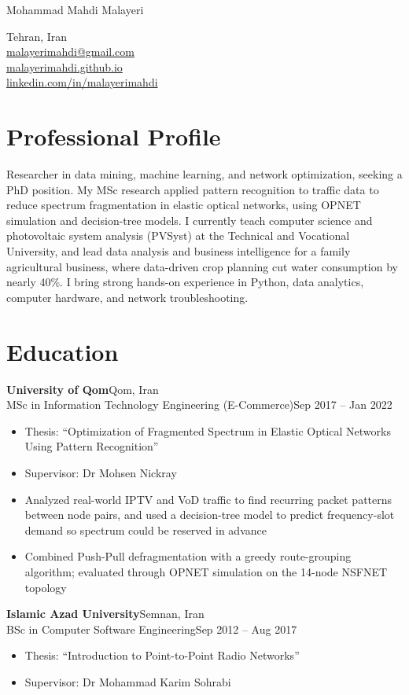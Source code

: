 \documentclass[10pt]{article}
\newcommand{\entry}[4]{\needspace{4\baselineskip}\textbf{#1}\hfill #2\\#3\hfill #4\par}
\newenvironment{dashes}{\begin{itemize}[label=--,leftmargin=2.2em,topsep=1pt,itemsep=0pt,parsep=0pt]}{\end{itemize}}
\newcommand{\gap}{\vspace{3pt}}
\begin{document}
{\fontsize{24}{28}\selectfont Mohammad Mahdi Malayeri}\hfill
\begin{minipage}[b]{0.42\textwidth}\raggedleft\small
Tehran, Iran\\
\href{mailto:malayerimahdi@gmail.com}{malayerimahdi@gmail.com}\\
\href{https://malayerimahdi.github.io}{malayerimahdi.github.io}\\
\href{https://www.linkedin.com/in/malayerimahdi/}{linkedin.com/in/malayerimahdi}
\end{minipage}

\section{Professional Profile}
Researcher in data mining, machine learning, and network optimization, seeking a PhD position. My MSc research applied pattern recognition to traffic data to reduce spectrum fragmentation in elastic optical networks, using OPNET simulation and decision-tree models. I currently teach computer science and photovoltaic system analysis (PVSyst) at the Technical and Vocational University, and lead data analysis and business intelligence for a family agricultural business, where data-driven crop planning cut water consumption by nearly 40\%. I bring strong hands-on experience in Python, data analytics, computer hardware, and network troubleshooting.

\section{Education}
\entry{University of Qom}{Qom, Iran}{MSc in Information Technology Engineering (E-Commerce)}{Sep 2017 -- Jan 2022}
\begin{dashes}
\item Thesis: ``Optimization of Fragmented Spectrum in Elastic Optical Networks Using Pattern Recognition''
\item Supervisor: Dr Mohsen Nickray
\item Analyzed real-world IPTV and VoD traffic to find recurring packet patterns between node pairs, and used a decision-tree model to predict frequency-slot demand so spectrum could be reserved in advance
\item Combined Push-Pull defragmentation with a greedy route-grouping algorithm; evaluated through OPNET simulation on the 14-node NSFNET topology
\end{dashes}
\gap
\entry{Islamic Azad University}{Semnan, Iran}{BSc in Computer Software Engineering}{Sep 2012 -- Aug 2017}
\begin{dashes}
\item Thesis: ``Introduction to Point-to-Point Radio Networks''
\item Supervisor: Dr Mohammad Karim Sohrabi
\end{dashes}
\end{document}

